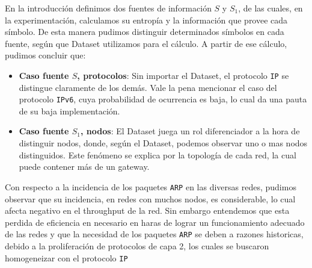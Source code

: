 En la introducción definimos dos fuentes de información $S$ y $S_{1}$, de las cuales, en la experimentación, calculamos su entropía y la información que provee cada símbolo. De esta manera pudimos distinguir determinados símbolos en cada fuente, según que Dataset utilizamos para el cálculo. A partir de ese cálculo, pudimos concluir que:
\begin{itemize}
  \item \textbf{Caso fuente $S$, protocolos}: Sin importar el Dataset, el protocolo \texttt{IP} se distingue claramente de los demás. Vale la pena mencionar el caso del protocolo \texttt{IPv6}, cuya probabilidad de ocurrencia es baja, lo cual da una pauta de su baja implementación.
  \item \textbf{Caso fuente $S_{1}$, nodos}: El Dataset juega un rol diferenciador a la hora de distinguir nodos, donde, según el Dataset, podemos observar uno o mas nodos distinguidos. Este fenómeno se explica por la topología de cada red, la cual puede contener más de un gateway.
\end{itemize}

Con respecto a la incidencia de los paquetes \texttt{ARP} en las diversas redes, pudimos observar que su incidencia, en redes con muchos nodos, es considerable, lo cual afecta negativo en el throughput de la red. Sin embargo entendemos que esta perdida de eficiencia en necesario en haras de lograr un funcionamiento adecuado de las redes y que la necesidad de los paquetes \texttt{ARP} se deben a razones historicas, debido a la proliferación de protocolos de capa 2, los cuales se buscaron homogeneizar con el protocolo \texttt{IP}
